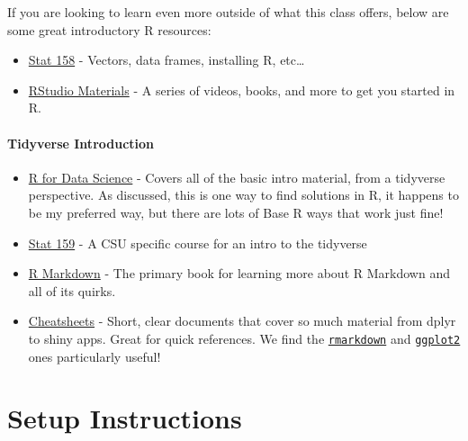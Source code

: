 \documentclass[
]{book}
\begin{document}
If you are looking to learn even more outside of what this class offers, below are some great introductory R resources:

\begin{itemize}
\item
  \href{https://csu-r.github.io/Module1/}{Stat 158} - Vectors, data frames, installing R, etc\ldots{}
\item
  \href{https://education.rstudio.com/learn/beginner/}{RStudio Materials} - A series of videos, books, and more to get you started in R.
\end{itemize}

\hypertarget{tidyverse-introduction}{%
\subsubsection{Tidyverse Introduction}\label{tidyverse-introduction}}

\begin{itemize}
\item
  \href{https://r4ds.had.co.nz/introduction.html}{R for Data Science} - Covers all of the basic intro material, from a tidyverse perspective. As discussed, this is one way to find solutions in R, it happens to be my preferred way, but there are lots of Base R ways that work just fine!
\item
  \href{https://csu-r.github.io/Module2/}{Stat 159} - A CSU specific course for an intro to the tidyverse
\item
  \href{https://bookdown.org/yihui/rmarkdown/\#preface}{R Markdown} - The primary book for learning more about R Markdown and all of its quirks.
\item
  \href{https://www.rstudio.com/resources/cheatsheets/}{Cheatsheets} - Short, clear documents that cover so much material from dplyr to shiny apps. Great for quick references. We find the \href{https://rstudio.github.io/cheatsheets/html/rmarkdown.html?_gl=1*1f2w4s3*_ga*MTc5NTY0NDA0Mi4xNjg2MzQ0MDUy*_ga_2C0WZ1JHG0*MTY5MTk1OTY1Ni42LjAuMTY5MTk1OTY1Ni4wLjAuMA..}{\texttt{rmarkdown}} and \href{https://rstudio.github.io/cheatsheets/html/data-visualization.html?_gl=1*1f2w4s3*_ga*MTc5NTY0NDA0Mi4xNjg2MzQ0MDUy*_ga_2C0WZ1JHG0*MTY5MTk1OTY1Ni42LjAuMTY5MTk1OTY1Ni4wLjAuMA..}{\texttt{ggplot2}} ones particularly useful!
\end{itemize}

\hypertarget{setup-instructions}{%
\chapter{Setup Instructions}\label{setup-instructions}}
\end{document}
